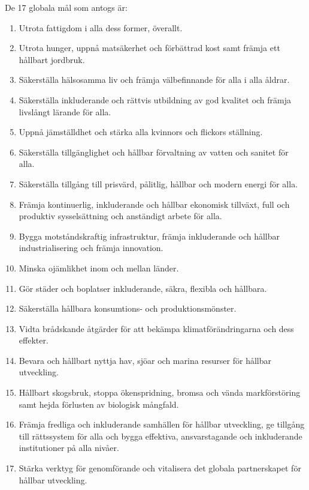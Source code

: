 \documentclass{report}
\begin{document}
 De 17 globala mål som antogs är: 
\begin{enumerate}
\item Utrota fattigdom i alla dess former, överallt.
\item Utrota hunger, uppnå matsäkerhet och förbättrad kost samt främja ett hållbart jordbruk.
\item Säkerställa hälsosamma liv och främja välbefinnande för alla i alla åldrar.
\item Säkerställa inkluderande och rättvis utbildning av god kvalitet och främja livslångt lärande för alla.
\item Uppnå jämställdhet och stärka alla kvinnors och flickors ställning.
\item Säkerställa tillgänglighet och hållbar förvaltning av vatten och sanitet för alla.
\item Säkerställa tillgång till prisvärd, pålitlig, hållbar och modern energi för alla.
\item Främja kontinuerlig, inkluderande och hållbar ekonomisk tillväxt, full och produktiv sysselsättning och anständigt arbete för alla.
\item Bygga motståndskraftig infrastruktur, främja inkluderande och hållbar industrialisering och främja innovation.
\item Minska ojämlikhet inom och mellan länder.
\item Gör städer och boplatser inkluderande, säkra, flexibla och hållbara.
\item Säkerställa hållbara konsumtions- och produktionsmönster.
\item Vidta brådskande åtgärder för att bekämpa klimatförändringarna och dess effekter.
\item Bevara och hållbart nyttja hav, sjöar och marina resurser för hållbar utveckling.
\item Hållbart skogsbruk, stoppa ökenspridning, bromsa och vända markförstöring samt hejda förlusten av biologisk mångfald.
\item Främja fredliga och inkluderande samhällen för hållbar utveckling, ge tillgång till rättssystem för alla och bygga effektiva, ansvarstagande och inkluderande institutioner på alla nivåer.
\item Stärka verktyg för genomförande och vitalisera det globala partnerskapet för hållbar utveckling. \cite{webKTH}
\end{enumerate}
\end{document}
